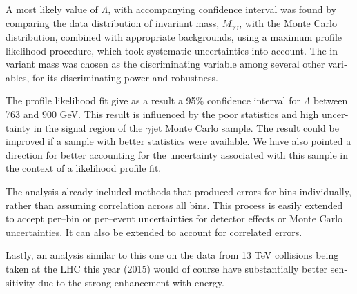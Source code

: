 \begin{english}
A most likely value of $\Lambda$, with accompanying confidence interval was found by comparing the data distribution of invariant mass, $M_{\gamma\gamma}$, with the Monte Carlo distribution, combined with appropriate backgrounds, using a maximum profile likelihood procedure, which took systematic uncertainties into account. The invariant mass was chosen as the discriminating variable among several other variables, for its discriminating power and robustness.

The profile likelihood fit give as a result a 95\% confidence interval for $\Lambda$ between 763 and 900 GeV. This result is influenced by the poor statistics and high uncertainty in the signal region of the \atlas{} $\gamma$jet Monte Carlo sample. The result could be improved if a sample with better statistics were available. We have also pointed a direction for better accounting for the uncertainty associated with this sample in the context of a likelihood profile fit.

The analysis already included methods that produced errors for bins individually, rather than assuming correlation across all bins. This process is easily extended to accept per--bin or per--event uncertainties for detector effects or Monte Carlo uncertainties. It can also be extended to account for correlated errors.

Lastly, an analysis similar to this one on the data from 13 TeV collisions being taken at the LHC this year (2015) would of course have substantially better sensitivity due to the strong enhancement with energy.


\printbibliography[title=References]



\end{english}

